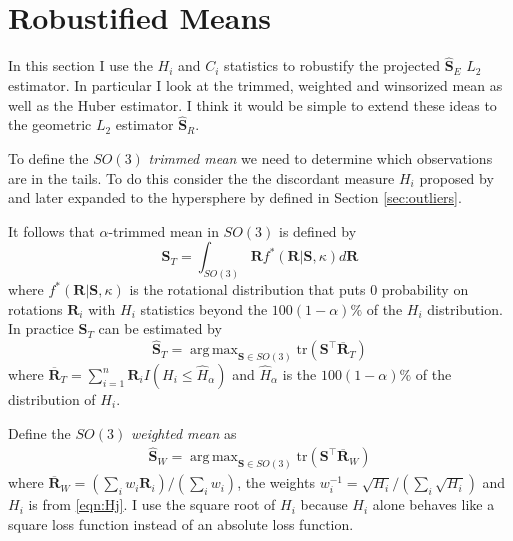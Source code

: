 \documentclass{article}\usepackage[]{graphicx}\usepackage[]{color}
\DeclareMathOperator*{\argmax}{arg\,max}
\newcommand{\ProjMean}{{\widehat{\bm S}_{E}}}
\newcommand{\GeomMean}{{\widehat{\bm S}_{R}}}
\newcommand{\WeightMean}{{\widehat{\bm S}_W}}
\newcommand{\TrimMean}{{\widehat{\bm S}_T}}
\begin{document}
\section{Robustified Means}

In this section I use the $H_i$ and $C_i$ statistics to robustify the projected $\ProjMean$ $L_2$ estimator.  In particular I look at the trimmed, weighted and winsorized mean as well as the Huber estimator.  I think it would be simple to extend these ideas to the geometric $L_2$ estimator $\GeomMean$.

To define the $SO(3)$ \emph{trimmed mean} we need to determine which observations are in the tails.  To do this consider the the discordant measure $H_i$ proposed by \cite{best1986} and later expanded to the hypersphere by \cite{figueiredo2005} defined in Section \ref{sec:outliers}.

It follows that $\alpha$-trimmed mean in $SO(3)$ is defined by
\[
\bm S_{T}=\int_{SO(3)}\bm Rf^*(\bm R|\bm S,\kappa)d\bm R
\]
where $f^*(\bm R|\bm S,\kappa)$ is the rotational distribution that puts $0$ probability on rotations $\bm R_i$ with $H_i$ statistics beyond the $100(1-\alpha)\%$ of the $H_i$ distribution.  In practice $\bm S_T$ can be estimated by
\[
\TrimMean=\argmax_{\bm S\in SO(3)}\text{tr}(\bm S^\top\overline{\bm R}_T)
\]
where $\overline{\bm R}_T=\sum_{i=1}^n\bm R_iI( H_i\leq \hat H_\alpha)$ and $\hat H_{\alpha}$ is the $100(1-\alpha)\%$ of the distribution of $H_i$.


Define the $SO(3)$ \emph{weighted mean} as
\begin{align*}
\WeightMean=\argmax_{\bm S\in SO(3)}\text{tr}(\bm S^\top\overline{\bm R}_W)
\end{align*}
where $\overline{\bm R}_W=(\sum_{i}w_i\bm R_i)/(\sum_i w_i)$, the weights $w_i^{-1}=\sqrt{H_i}/(\sum_i \sqrt{H_i})$ and $H_i$ is from \eqref{eqn:Hj}.  I use the square root of $H_i$ because $H_i$ alone behaves like a square loss function instead of an absolute loss function.
\end{document}
